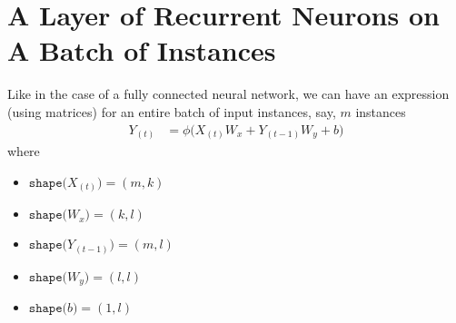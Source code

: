 \documentclass{article}
\begin{document}
\section{A Layer of Recurrent Neurons on A Batch of Instances}
Like in the case of a fully connected neural network, we can have an expression (using matrices) for
an entire batch of input instances, say, $m$ instances
\begin{align*}
  Y_{(t)} &= \phi\bigg(
    X_{(t)} W_x
    + Y_{(t-1)} W_y
    + b
  \bigg)
\end{align*}
where
\begin{itemize}
  \item $\texttt{shape(} X_{(t)}\texttt{)}= (m, k)$
  \item $\texttt{shape(} W_{x}\texttt{)}= (k, l)$
  \item $\texttt{shape(} Y_{(t-1)}\texttt{)}= (m, l)$
  \item $\texttt{shape(} W_{y}\texttt{)}= (l, l)$
  \item $\texttt{shape(} b\texttt{)}= (1, l)$
\end{itemize}
\end{document}
